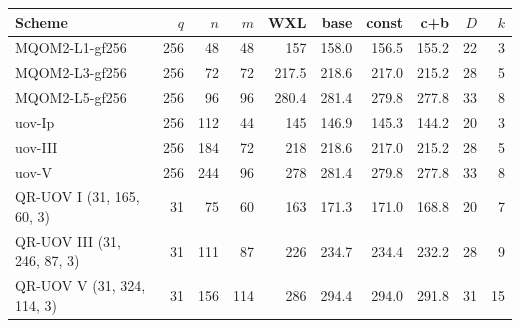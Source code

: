 \begin{tabular}{@{}lrrr@{\hspace*{1.5em}}r@{\hspace*{1.5em}}rrrrr@{}}
\toprule
Scheme & $q$ & $n$ & $m$ & WXL & base & const & c+b & $D$ & $k$ \\
\midrule
MQOM2-L1-gf256 & 256 & 48 & 48 & 157 & 158.0 & 156.5 & 155.2 & 22 & 3 \\
MQOM2-L3-gf256 & 256 & 72 & 72 & 217.5 & 218.6 & 217.0 & 215.2 & 28 & 5 \\
MQOM2-L5-gf256 & 256 & 96 & 96 & 280.4 & 281.4 & 279.8 & 277.8 & 33 & 8 \\
\midrule
uov-Ip & 256 & 112 & 44 & 145 & 146.9 & 145.3 & 144.2 & 20 & 3 \\
uov-III & 256 & 184 & 72 & 218 & 218.6 & 217.0 & 215.2 & 28 & 5 \\
uov-V & 256 & 244 & 96 & 278 & 281.4 & 279.8 & 277.8 & 33 & 8 \\
\midrule
QR-UOV I (31, 165, 60, 3) & 31 & 75 & 60 & 163 & 171.3 & 171.0 & 168.8 & 20 & 7 \\
QR-UOV III (31, 246, 87, 3) & 31 & 111 & 87 & 226 & 234.7 & 234.4 & 232.2 & 28 & 9 \\
QR-UOV V (31, 324, 114, 3) & 31 & 156 & 114 & 286 & 294.4 & 294.0 & 291.8 & 31 & 15 \\
\bottomrule
\end{tabular}
